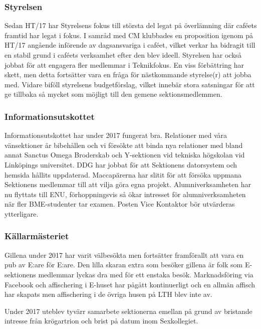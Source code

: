 \documentclass[../_main/handlingar.tex]{subfiles}
\begin{document}

\subsubsection*{Styrelsen}
Sedan HT/17 har Styrelsens fokus till största del legat på överlämning där caféets framtid har legat i fokus. I samråd med CM klubbades en proposition igenom på HT/17 angående införende av dagsansvariga i caféet, vilket verkar ha bidragit till en stabil grund i caféets verksamhet efter den blev ideell. Styrelsen har också jobbat för att engagera fler medlemmar i Teknikfokus. En viss förbättring har skett, men detta fortsätter vara en fråga för nästkommande styrelse(r) att jobba med. Vidare biföll styrelsens budgetförslag, vilket innebär stora satsningar för att ge tillbaka så mycket som möjligt till den gemene sektionsmedlemmen.

\subsubsection*{Informationsutskottet}
Informationsutskottet har under 2017 fungerat bra. Relationer med våra vänsektioner är bibehållen och vi försökte att binda nya relationer med bland annat Sanctus Omega Broderskab och Y-sektionen vid tekniska högskolan vid Linköpings universitet. DDG har jobbat för att Sektionens datorsystem och hemsida hållits uppdaterad. Maccapärerna har slitit för att försöka uppmana Sektionens medlemmar till att vilja göra egna projekt. Alumniverksamheten har nu flyttats till ENU, förhoppningsvis så ökar intresset för alumniverksamheten när fler BME-studenter tar examen. Posten Vice Kontaktor bör utvärderas ytterligare.

\subsubsection*{Källarmästeriet}
Gillena under 2017 har varit välbesökta men fortsätter framförallt att vara en pub av E:are för E:are. Den lilla skaran extra som besöker gillena är folk som E-sektionens medlemmar lyckas dra med för ett enstaka besök. Marknadsföring via Facebook och affischering i E-huset har pågått kontinuerligt och en allmän affisch har skapats men affischering i de övriga husen på LTH blev inte av.

Under 2017 uteblev tyvärr samarbete sektionerna emellan på grund av bristande intresse från krögartrion och brist på datum inom Sexkollegiet.
\end{document}
